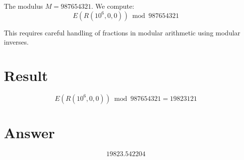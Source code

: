 \documentclass[12pt]{article}
\begin{document}
The modulus $M = 987654321$. We compute:
\[
    E(R(10^6, 0, 0)) \bmod 987654321
\]

This requires careful handling of fractions in modular arithmetic using modular inverses.

\section{Result}

\[
    E(R(10^6, 0, 0)) \bmod 987654321 = \boxed{19823121}
\]

\section{Answer}

\[
\boxed{19823.542204}
\]
\end{document}
